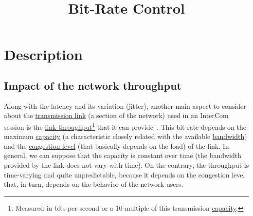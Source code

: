 
\title{Bit-Rate Control}


\maketitle

\tableofcontents

\section{Description}
\subsection{Impact of the network throughput}
Along with the latency and its variation (jitter), another main aspect
to consider about the
\href{https://en.wikipedia.org/wiki/Telecommunications_link}{transmission
  link} (a section of the network) used in an InterCom session is the
\href{https://en.wikipedia.org/wiki/Channel_capacityhttps://en.wikipedia.org/wiki/Network_throughput}{link
  throughput}\footnote{Measured in bits per second or a $10$-multiple
  of this transmission
  \href{https://en.wikipedia.org/wiki/Bandwidth_(computing)}{capacity}.}
that it can provide~\cite{Forouzan,Tanenbaum}. This bit-rate depends on
the maximum
\href{https://en.wikipedia.org/wiki/Channel_capacity}{capacity} (a
characteristic closely related with the available
\href{https://en.wikipedia.org/wiki/Bandwidth_(signal_processing)}{bandwidth})
and the
\href{https://en.wikipedia.org/wiki/Network_congestion}{congestion
  level} (that basically depends on the load) of the link. In general,
we can suppose that the capacity is constant over time (the
bandwidth provided by the link does not vary with time). On the
contrary, the throughput is time-varying and quite unpredictable,
because it depends on the congestion level that, in turn, depends
on the behavior of the network users.

